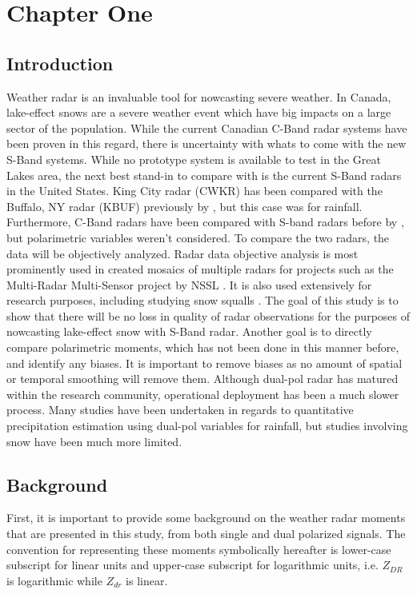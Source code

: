 \chapter{Chapter One}
\section{Introduction}
Weather radar is an invaluable tool for nowcasting severe weather. In Canada, lake-effect snows are a severe weather event which have big impacts on a large sector of the population. While the current Canadian C-Band radar systems have been proven in this regard, there is uncertainty with whats to come with the new S-Band systems. While no prototype system is available to test in the Great Lakes area, the next best stand-in to compare with is the current S-Band radars in the United States. King City radar (CWKR) has been compared with the Buffalo, NY radar (KBUF) previously by \cite{Boodoo2015}, but this case was for rainfall. Furthermore, C-Band radars have been compared with S-band radars before by \cite{Abon2014}, but polarimetric variables weren't considered. To compare the two radars, the data will be objectively analyzed. Radar data objective analysis is most prominently used in created mosaics of multiple radars for projects such as the Multi-Radar Multi-Sensor project by NSSL \citep{Zhang2016}. It is also used extensively for research purposes, including studying snow squalls \citep{Mulholland2017}.  The goal of this study is to show that there will be no loss in quality of radar observations for the purposes of nowcasting lake-effect snow with S-Band radar. Another goal is to directly compare polarimetric moments, which has not been done in this manner before, and identify any biases. It is important to remove biases as no amount of spatial or temporal smoothing will remove them.  Although dual-pol radar has matured within the research community, operational deployment has been a much slower process. Many studies have been undertaken in regards to quantitative precipitation estimation using dual-pol variables for rainfall, but studies involving snow have been much more limited. 
\section{Background}
First, it is important to provide some background on the weather radar moments that are presented in this study, from both single and dual polarized signals. The convention for representing these moments symbolically hereafter is lower-case subscript for linear units and upper-case subscript for logarithmic units, i.e. $Z_{DR}$ is logarithmic while $Z_{dr}$ is linear.
